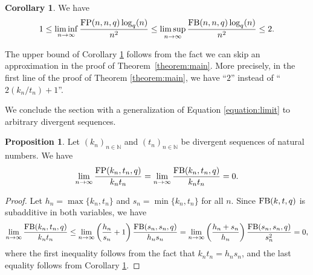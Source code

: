 \documentclass[11pt,a4paper]{article}
\theoremstyle{definition}
\newtheorem{proposition}[theorem]{Proposition}
\newtheorem{corollary}[theorem]{Corollary}
\newcommand{\N}{\mathbb N}
\newcommand{\fb}{\textnormal{FB}}
\newcommand{\fp}{\textnormal{FP}}
\begin{document}
\begin{corollary}\label{corollary:limk^2=0}
    We have
    \begin{equation*}
        1\leq\liminf_{n\to\infty}\frac{\fp(n,n,q)\log_q(n)}{n^2}\leq\limsup_{n\to\infty}\frac{\fb(n,n,q)\log_q(n)}{n^2}\leq2.
    \end{equation*}
\end{corollary}
The upper bound of Corollary \ref{corollary:limk^2=0} follows
from the fact we can skip an 
approximation in the proof of Theorem~\ref{theorem:main}. More precisely, in the first line of the proof of Theorem \ref{theorem:main}, we have ``$2$'' instead of ``$2(k_n/t_n)+1$''.

We conclude the section with a generalization of Equation \eqref{equation:limit} to arbitrary divergent sequences.
\begin{proposition}
    Let $(k_n)_{n\in\N}$ and $(t_n)_{n\in\N}$ be divergent sequences of natural numbers. We have
    \begin{equation*}
        \lim_{n\to\infty}\frac{\fp(k_n,t_n,q)}{k_nt_n}=\lim_{n\to\infty}\frac{\fb(k_n,t_n,q)}{k_nt_n}=0.
    \end{equation*}
\end{proposition}
\begin{proof}
    Let $h_n=\max\{k_n,t_n\}$ and $s_n=\min\{k_n,t_n\}$ for all $n$. Since $\fb(k,t,q)$ is subadditive in both variables, we have 
    \begin{equation*}
        \lim_{n\to\infty}\frac{\fb(k_n,t_n,q)}{k_nt_n}\leq \lim_{n\to\infty}\left(\frac{h_n}{s_n}+1\right)\frac{\fb(s_n,s_n,q)}{h_ns_n}=\lim_{n\to\infty}\left(\frac{h_n+s_n}{h_n}\right)\frac{\fb(s_n,s_n,q)}{s_n^2}=0,
    \end{equation*}
    where the first inequality follows from the fact that $k_nt_n=h_ns_n$, and the last equality follows from Corollary \ref{corollary:limk^2=0}.
\end{proof}
	

\end{document}
